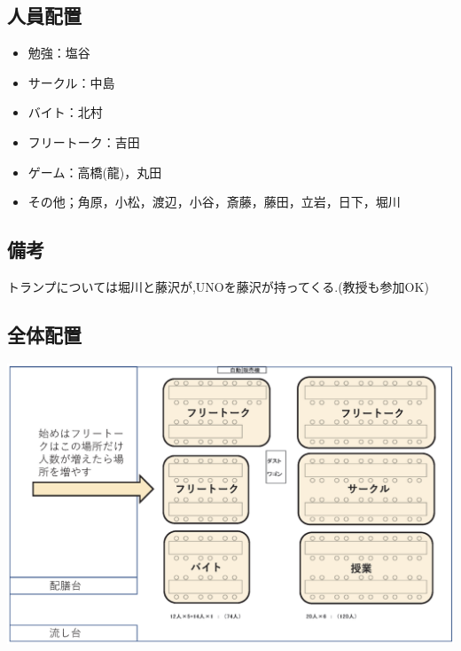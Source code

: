 \subsection{人員配置}
\begin{itemize}
\item 勉強：塩谷
\item サークル：中島
\item バイト：北村
\item フリートーク：吉田
\item ゲーム：高橋(龍)，丸田
\item その他；角原，小松，渡辺，小谷，斎藤，藤田，立岩，日下，堀川
\end{itemize}
\subsection{備考}
トランプについては堀川と藤沢が,UNOを藤沢が持ってくる.(教授も参加OK)
\subsection{全体配置}
\begin{center}
\includegraphics[width=15cm]{./13/hone.eps}
\end{center}
